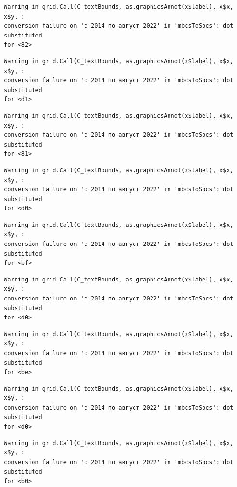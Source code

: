 \documentclass[
  letterpaper,
  DIV=11,
  numbers=noendperiod]{scrartcl}
\begin{document}
\begin{verbatim}
Warning in grid.Call(C_textBounds, as.graphicsAnnot(x$label), x$x, x$y, :
conversion failure on 'с 2014 по август 2022' in 'mbcsToSbcs': dot substituted
for <82>
\end{verbatim}

\begin{verbatim}
Warning in grid.Call(C_textBounds, as.graphicsAnnot(x$label), x$x, x$y, :
conversion failure on 'с 2014 по август 2022' in 'mbcsToSbcs': dot substituted
for <d1>
\end{verbatim}

\begin{verbatim}
Warning in grid.Call(C_textBounds, as.graphicsAnnot(x$label), x$x, x$y, :
conversion failure on 'с 2014 по август 2022' in 'mbcsToSbcs': dot substituted
for <81>
\end{verbatim}

\begin{verbatim}
Warning in grid.Call(C_textBounds, as.graphicsAnnot(x$label), x$x, x$y, :
conversion failure on 'с 2014 по август 2022' in 'mbcsToSbcs': dot substituted
for <d0>
\end{verbatim}

\begin{verbatim}
Warning in grid.Call(C_textBounds, as.graphicsAnnot(x$label), x$x, x$y, :
conversion failure on 'с 2014 по август 2022' in 'mbcsToSbcs': dot substituted
for <bf>
\end{verbatim}

\begin{verbatim}
Warning in grid.Call(C_textBounds, as.graphicsAnnot(x$label), x$x, x$y, :
conversion failure on 'с 2014 по август 2022' in 'mbcsToSbcs': dot substituted
for <d0>
\end{verbatim}

\begin{verbatim}
Warning in grid.Call(C_textBounds, as.graphicsAnnot(x$label), x$x, x$y, :
conversion failure on 'с 2014 по август 2022' in 'mbcsToSbcs': dot substituted
for <be>
\end{verbatim}

\begin{verbatim}
Warning in grid.Call(C_textBounds, as.graphicsAnnot(x$label), x$x, x$y, :
conversion failure on 'с 2014 по август 2022' in 'mbcsToSbcs': dot substituted
for <d0>
\end{verbatim}

\begin{verbatim}
Warning in grid.Call(C_textBounds, as.graphicsAnnot(x$label), x$x, x$y, :
conversion failure on 'с 2014 по август 2022' in 'mbcsToSbcs': dot substituted
for <b0>
\end{verbatim}
\end{document}
